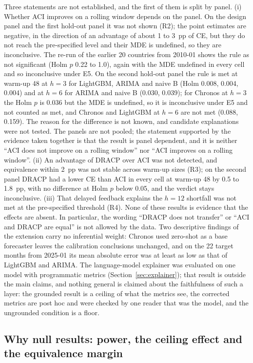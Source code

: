 Three statements are not established, and the first of them is split by panel. (i) Whether ACI improves on a rolling window depends on the panel. On the design panel and the first hold-out panel it was not shown (R2); the point estimates are negative, in the direction of an advantage of about 1 to 3~pp of CE, but they do not reach the pre-specified level and their MDE is undefined, so they are inconclusive. The re-run of the earlier 20 countries from 2010-01 shows the rule as not significant (Holm $p$ 0.22 to 1.0), again with the MDE undefined in every cell and so inconclusive under E5. On the second hold-out panel the rule is met at warm-up 48 at $h=3$ for LightGBM, ARIMA and naive B (Holm 0.008, 0.004, 0.004) and at $h=6$ for ARIMA and naive B (0.030, 0.039); for Chronos at $h=3$ the Holm $p$ is 0.036 but the MDE is undefined, so it is inconclusive under E5 and not counted as met, and Chronos and LightGBM at $h=6$ are not met (0.088, 0.159). The reason for the difference is not known, and candidate explanations were not tested. The panels are not pooled; the statement supported by the evidence taken together is that the result is panel dependent, and it is neither ``ACI does not improve on a rolling window'' nor ``ACI improves on a rolling window''. (ii) An advantage of DRACP over ACI was not detected, and equivalence within 2~pp was not stable across warm-up sizes (R3); on the second panel DRACP had a lower CE than ACI in every cell at warm-up 48 by 0.5 to 1.8~pp, with no difference at Holm $p$ below 0.05, and the verdict stays inconclusive. (iii) That delayed feedback explains the $h=12$ shortfall was not met at the pre-specified threshold (R4). None of these results is evidence that the effects are absent. In particular, the wording ``DRACP does not transfer'' or ``ACI and DRACP are equal'' is not allowed by the data. Two descriptive findings of the extension carry no inferential weight: Chronos used zero-shot as a base forecaster leaves the calibration conclusions unchanged, and on the 22 target months from 2025-01 its mean absolute error was at least as low as that of LightGBM and ARIMA. The language-model explainer was evaluated on one model with programmatic metrics (Section~\ref{sec:explainer}); that result is outside the main claims, and nothing general is claimed about the faithfulness of such a layer: the grounded result is a ceiling of what the metrics see, the corrected metrics are post hoc and were checked by one reader that was the model, and the ungrounded condition is a floor.

\subsection{Why null results: power, the ceiling effect and the equivalence margin}\label{sec:nulls}

